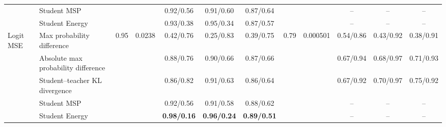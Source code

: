 \documentclass[border=2pt]{standalone}
\begin{document}
\begin{tabular}{llcccccccccc}
 & Student MSP &  &  & 0.92/0.56 & 0.91/0.60 & 0.87/0.64 &  &  & -- & -- & -- \\
 & Student Energy &  &  & 0.93/0.38 & 0.95/0.34 & 0.87/0.57 &  &  & -- & -- & -- \\
\addlinespace
Logit MSE & Max probability difference & 0.95 & 0.0238 & 0.42/0.76 & 0.25/0.83 & 0.39/0.75 & 0.79 & 0.000501 & 0.54/0.86 & 0.43/0.92 & 0.38/0.91 \\
 & Absolute max probability difference &  &  & 0.88/0.76 & 0.90/0.66 & 0.87/0.66 &  &  & 0.67/0.94 & 0.68/0.97 & 0.71/0.93 \\
 & Student--teacher KL divergence &  &  & 0.86/0.82 & 0.91/0.63 & 0.86/0.64 &  &  & 0.67/0.92 & 0.70/0.97 & 0.75/0.92 \\
 & Student MSP &  &  & 0.92/0.56 & 0.91/0.58 & 0.88/0.62 &  &  & -- & -- & -- \\
 & Student Energy &  &  & \textbf{0.98/0.16} & \textbf{0.96/0.24} & \textbf{0.89/0.51} &  &  & -- & -- & -- \\
\bottomrule
\end{tabular}
\end{document}
